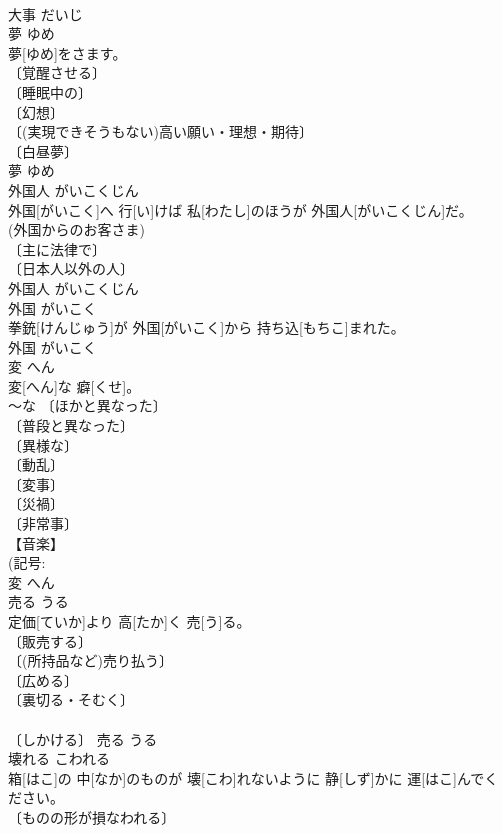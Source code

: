\documentclass[8pt]{extreport}
\begin{document}
\begin{CJK}{UTF8}{min}
\\	[＝おおごと]	大事	だいじ	
\\	夢	ゆめ	
\\	夢[ゆめ]をさます。	
\\	〔覚醒させる〕 
\\	〔睡眠中の〕 
\\	〔幻想〕 
\\	〔(実現できそうもない)高い願い・理想・期待〕 
\\	〔白昼夢〕 
\\	夢	ゆめ	
\\	外国人	がいこくじん	
\\	外国[がいこく]へ 行[い]けば 私[わたし]のほうが 外国人[がいこくじん]だ。	
\\	(外国からのお客さま) 
\\	〔主に法律で〕 
\\	〔日本人以外の人〕 
\\	外国人	がいこくじん	
\\	外国	がいこく	
\\	拳銃[けんじゅう]が 外国[がいこく]から 持ち込[もちこ]まれた。	
\\	外国	がいこく	
\\	変	へん	
\\	変[へん]な 癖[くせ]。	
\\	～な 〔ほかと異なった〕 
\\	〔普段と異なった〕 
\\	〔異様な〕 
\\	〔動乱〕 
\\	〔変事〕 
\\	〔災禍〕 
\\	〔非常事〕 
\\	【音楽】 
\\	(記号: 
\\	変	へん	
\\	売る	うる	
\\	定価[ていか]より 高[たか]く 売[う]る。	
\\	〔販売する〕 
\\	〔(所持品など)売り払う〕 
\\	〔広める〕 
\\	〔裏切る・そむく〕 
\\	[＝うらぎる] 
\\	〔しかける〕	売る	うる	
\\	壊れる	こわれる	
\\	箱[はこ]の 中[なか]のものが 壊[こわ]れないように 静[しず]かに 運[はこ]んでください。	
\\	〔ものの形が損なわれる〕 

\end{CJK}
\end{document}
